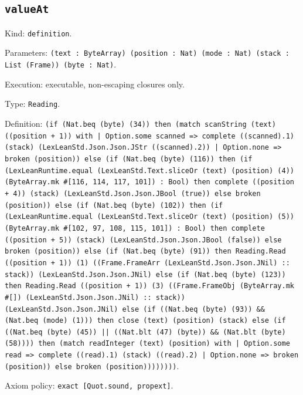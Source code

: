 \documentclass[11pt]{article}
\begin{document}
\subsection*{\texttt{valueAt}}
\noindent Kind: \texttt{definition}.\par
\noindent Parameters: \texttt{(text : ByteArray) (position : Nat) (mode : Nat) (stack : List (Frame)) (byte : Nat)}.\par
\noindent Execution: executable, non-escaping closures only.\par
\noindent Type: \texttt{Reading}.\par
\noindent Definition: \texttt{(if (Nat.beq (byte) (34)) then (match scanString (text) ((position + 1)) with | Option.some scanned => complete ((scanned).1) (stack) (LexLeanStd.Json.Json.JStr ((scanned).2)) | Option.none => broken (position)) else (if (Nat.beq (byte) (116)) then (if (LexLeanRuntime.equal (LexLeanStd.Text.sliceOr (text) (position) (4)) (ByteArray.mk \#[116, 114, 117, 101]) : Bool) then complete ((position + 4)) (stack) (LexLeanStd.Json.Json.JBool (true)) else broken (position)) else (if (Nat.beq (byte) (102)) then (if (LexLeanRuntime.equal (LexLeanStd.Text.sliceOr (text) (position) (5)) (ByteArray.mk \#[102, 97, 108, 115, 101]) : Bool) then complete ((position + 5)) (stack) (LexLeanStd.Json.Json.JBool (false)) else broken (position)) else (if (Nat.beq (byte) (91)) then Reading.Read ((position + 1)) (1) ((Frame.FrameArr (LexLeanStd.Json.Json.JNil) :: stack)) (LexLeanStd.Json.Json.JNil) else (if (Nat.beq (byte) (123)) then Reading.Read ((position + 1)) (3) ((Frame.FrameObj (ByteArray.mk \#[]) (LexLeanStd.Json.Json.JNil) :: stack)) (LexLeanStd.Json.Json.JNil) else (if ((Nat.beq (byte) (93)) \&\& (Nat.beq (mode) (1))) then close (text) (position) (stack) else (if ((Nat.beq (byte) (45)) || ((Nat.blt (47) (byte)) \&\& (Nat.blt (byte) (58)))) then (match readInteger (text) (position) with | Option.some read => complete ((read).1) (stack) ((read).2) | Option.none => broken (position)) else broken (position))))))))}.\par
\noindent Axiom policy: \texttt{exact [Quot.sound, propext]}.\par
\end{document}
